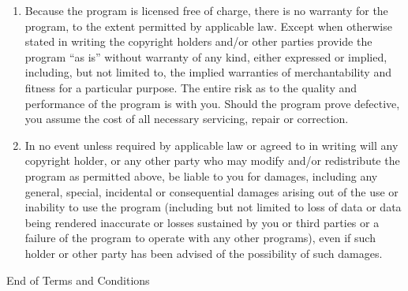 \documentclass[a4paper]{article}
\begin{document}
\begin{enumerate}
\begin{center}
{\Large\sc
No Warranty
}
\end{center}

\item
{\sc Because the program is licensed free of charge, there is no warranty
for the program, to the extent permitted by applicable law.  Except when
otherwise stated in writing the copyright holders and/or other parties
provide the program ``as is'' without warranty of any kind, either expressed
or implied, including, but not limited to, the implied warranties of
merchantability and fitness for a particular purpose.  The entire risk as
to the quality and performance of the program is with you.  Should the
program prove defective, you assume the cost of all necessary servicing,
repair or correction.}

\item
{\sc In no event unless required by applicable law or agreed to in writing
will any copyright holder, or any other party who may modify and/or
redistribute the program as permitted above, be liable to you for damages,
including any general, special, incidental or consequential damages arising
out of the use or inability to use the program (including but not limited
to loss of data or data being rendered inaccurate or losses sustained by
you or third parties or a failure of the program to operate with any other
programs), even if such holder or other party has been advised of the
possibility of such damages.}

\end{enumerate}


\begin{center}
{\Large\sc End of Terms and Conditions}
\end{center}
\end{document}
